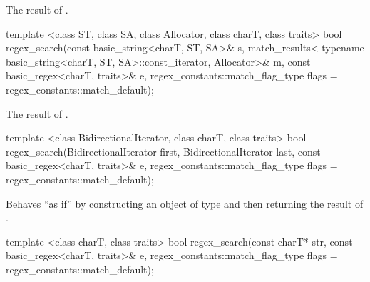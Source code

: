 \begin{itemdescr}
\pnum
\returns  The result of . 
\end{itemdescr}

%
\begin{itemdecl}
template <class ST, class SA, class Allocator, class charT, class traits>
  bool regex_search(const basic_string<charT, ST, SA>& s,
                    match_results<
                      typename basic_string<charT, ST, SA>::const_iterator, 
                      Allocator>& m, 
                    const basic_regex<charT, traits>& e,
                    regex_constants::match_flag_type flags =
                      regex_constants::match_default); 
\end{itemdecl}

\begin{itemdescr}
\pnum\returns  The result of .
\end{itemdescr}

%
\begin{itemdecl}
template <class BidirectionalIterator, class charT, class traits>
  bool regex_search(BidirectionalIterator first, BidirectionalIterator last,
                    const basic_regex<charT, traits>& e,
                    regex_constants::match_flag_type flags =
                      regex_constants::match_default); 
\end{itemdecl}

\begin{itemdescr}
\pnum
\effects  Behaves ``as if'' by constructing an object 
of type  and then returning
the result of .
\end{itemdescr}

%
\begin{itemdecl}
template <class charT, class traits>
  bool regex_search(const charT* str,
                    const basic_regex<charT, traits>& e,
                    regex_constants::match_flag_type flags =
                      regex_constants::match_default); 
\end{itemdecl}

\begin{itemdescr}
\pnum
\returns  {}
\end{itemdescr}

